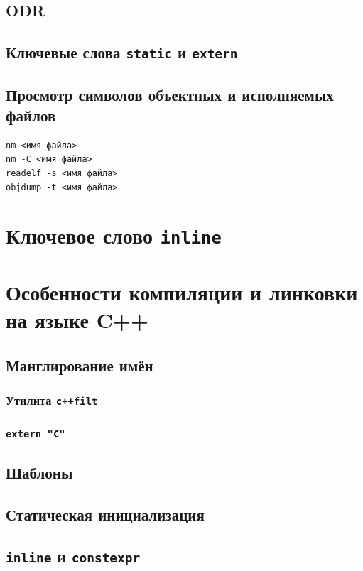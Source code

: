 \documentclass{article}
\begin{document}
\subsection*{ODR}
\subsection*{Ключевые слова \texttt{static} и \texttt{extern}}

\subsection*{Просмотр символов объектных и исполняемых файлов}
\begin{verbatim}
nm <имя файла>
nm -C <имя файла>
readelf -s <имя файла>
objdump -t <имя файла>
\end{verbatim}

\section{Ключевое слово \texttt{inline}}
\section{Особенности компиляции и линковки на языке C++}
\subsection*{Манглирование имён}
\subsubsection*{Утилита \texttt{c++filt}}
\subsubsection*{\texttt{extern "C"}}
\subsection*{Шаблоны}
\subsection*{Статическая инициализация}
\subsection*{\texttt{inline} и \texttt{constexpr}}
\end{document}
